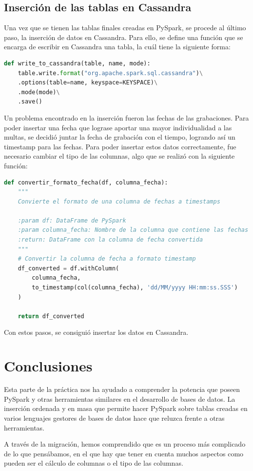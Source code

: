 \documentclass[]{article}
\begin{document}
\subsection{Inserción de las tablas en Cassandra}
Una vez que se tienen las tablas finales creadas en PySpark, se procede al último paso, la inserción de datos en Cassandra. Para ello, se define una función que se encarga de escribir en Cassandra una tabla, la cuál tiene la siguiente forma:

\begin{lstlisting}[language=python, caption=Carga de datos en PySpark]
def write_to_cassandra(table, name, mode):
    table.write.format("org.apache.spark.sql.cassandra")\
    .options(table=name, keyspace=KEYSPACE)\
    .mode(mode)\
    .save()
\end{lstlisting}

Un problema encontrado en la inserción fueron las fechas de las grabaciones. Para poder insertar una fecha que lograse aportar una mayor individualidad a las multas, se decidió juntar la fecha de grabación con el tiempo, logrando así un timestamp para las fechas. Para poder insertar estos datos correctamente, fue necesario cambiar el tipo de las columnas, algo que se realizó con la siguiente función:

\begin{lstlisting}[language=python, caption=Carga de datos en PySpark]
def convertir_formato_fecha(df, columna_fecha):
    """
    Convierte el formato de una columna de fechas a timestamps

    :param df: DataFrame de PySpark
    :param columna_fecha: Nombre de la columna que contiene las fechas a convertir
    :return: DataFrame con la columna de fecha convertida
    """
    # Convertir la columna de fecha a formato timestamp
    df_converted = df.withColumn(
        columna_fecha,
        to_timestamp(col(columna_fecha), 'dd/MM/yyyy HH:mm:ss.SSS')
    )

    return df_converted
\end{lstlisting}

Con estos pasos, se consiguió insertar los datos en Cassandra.

\newpage
\section{Conclusiones}
\label{sec:conclusion}
Esta parte de la práctica nos ha ayudado a comprender la potencia que poseen PySpark y otras herramientas similares en el desarrollo de bases de datos. La inserción ordenada y en masa que permite hacer PySpark sobre tablas creadas en varios lenguajes gestores de bases de datos hace que reluzca frente a otras herramientas.

A través de la migración, hemos comprendido que es un proceso más complicado de lo que pensábamos, en el que hay que tener en cuenta muchos aspectos como pueden ser el cálculo de columnas o el tipo de las columnas.
\end{document}
